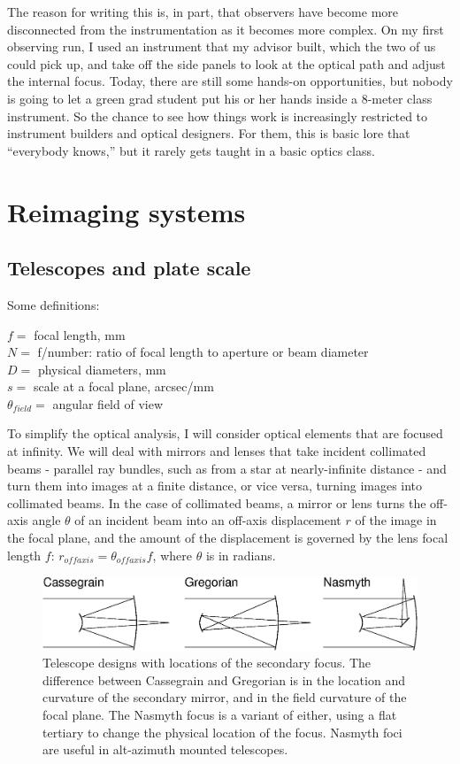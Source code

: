 \documentclass[12pt]{article}
\begin{document}
The reason for writing this is, in part, that observers have become
more disconnected from the instrumentation as it becomes more complex.
On my first observing run, I used an instrument that
my advisor built, which the two of us could pick up, and
take off the side panels to look at the optical path and adjust
the internal focus.  Today, there are still some hands-on
opportunities, but nobody is going to let a green 
grad student put his or her hands inside a 8-meter class instrument.
So the chance to see how things work is increasingly 
restricted to instrument builders and optical designers.  
For them, this is basic lore
that ``everybody knows,'' but it rarely gets taught in a
basic optics class.


\section{Reimaging systems}

\subsection{Telescopes and plate scale}

Some definitions:

\noindent
$f =$ focal length, mm \\
$N =$ f/number: ratio of focal length to aperture or beam diameter \\
$D =$ physical diameters, mm \\
$s =$ scale at a focal plane, arcsec/mm \\
$\theta_{field} =$ angular field of view 

To simplify the optical analysis, I will consider optical
elements that are focused at infinity.
We will deal with mirrors and lenses that take
incident collimated beams - parallel ray bundles, such as from a
star at nearly-infinite distance - and turn them into images
at a finite distance, or vice versa, turning images into collimated 
beams.  In the case of collimated beams, a mirror or lens turns the off-axis
angle $\theta$ of an incident beam into an off-axis displacement $r$
of the image in the focal plane,
and the amount of the displacement is governed by the 
lens focal length $f$: $r_{offaxis} = \theta_{offaxis} f$, where
$\theta$ is in radians.

\begin{figure}[ht]
\centerline{
\includegraphics[width=5.5truein]{teltypes.eps}
}
\caption{Telescope designs with locations of the secondary focus.  
The difference between Cassegrain and Gregorian is in the
location and curvature of the secondary mirror, and in the
field curvature of the focal plane.  The Nasmyth focus is a
variant of either, using a flat tertiary to change the physical
location of the focus.  Nasmyth foci are useful in alt-azimuth
mounted telescopes.
}
\label{fig-teltypes}
\end{figure}
\end{document}
